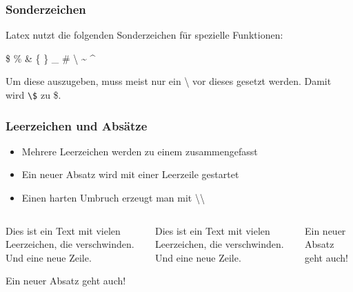 \begin{frame}[fragile]
    \frametitle{Sonderzeichen}
    
    Latex nutzt die folgenden Sonderzeichen für spezielle Funktionen:
    \begin{center}
      \hfill \$
      \hfill \%
      \hfill \&
      \hfill \{
      \hfill \}
      \hfill \_
      \hfill \#
      \hfill \textbackslash
      \hfill \~{}
      \hfill \^{}
      \hfill
    \end{center}
    \pause
    Um diese auszugeben, muss meist nur ein \textbackslash{} vor dieses gesetzt werden.
    Damit wird \verb+\$+ zu \$.
\end{frame}


\begin{frame}[fragile]
    \frametitle{Leerzeichen und Absätze}
    
    \begin{itemize}
        \item Mehrere Leerzeichen werden zu einem zusammengefasst \pause
        \item Ein neuer Absatz wird mit einer Leerzeile gestartet\pause
        \item Einen harten Umbruch erzeugt man mit \textbackslash\textbackslash
    \end{itemize}
    \pause    
    
    \begin{columns}[c]
            \begin{verbatim*}
Dies ist ein Text  mit
vielen   Leerzeichen, die
verschwinden.
Und eine neue  Zeile.

Ein neuer Absatz geht auch!
\end{verbatim*}
        \pause
        Dies ist ein Text  mit
        vielen   Leerzeichen, die
        verschwinden.
        Und eine neue  Zeile.

        Ein neuer Absatz geht auch!
\end{columns}
\end{frame}